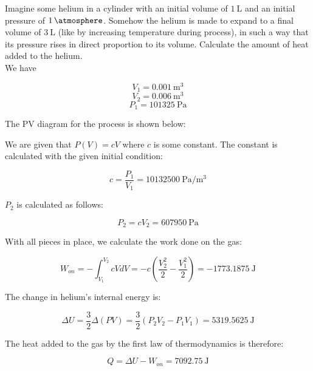 \documentclass[12pt, a4paper]{article}
\newcounter{exa}
\begin{document}
\begin{texample}
Imagine some helium in a cylinder with an initial volume of $\SI{1}{\liter}$ and an initial pressure of $\SI{1}{\atmosphere}$. Somehow the helium is made to expand to a final volume of $\SI{3}{\liter}$ (like by increasing temperature during process), in such a way that its pressure rises in direct proportion to its volume. Calculate the amount of heat added to the helium. \\

We have

\[V_1=\SI{0.001}{\cubic\meter}\]
\[V_2=\SI{0.006}{\cubic\meter}\]
\[P_1=\SI{101325}{\pascal}\]

The PV diagram for the process is shown below:

\begin{figure}[H]
\centering
{}
\end{figure}

We are given that $P(V)=cV$ where $c$ is some constant. The constant is calculated with the given initial condition:

\[c=\frac{P_1}{V_1}=\SI{10132500}{\pascal\per\cubic\meter}\]

$P_2$ is calculated as follows:

\[P_2=cV_2=\SI{607950}{\pascal}\]

With all pieces in place, we calculate the work done on the gas:

\[W_{on}=-\int_{V_1}^{V_2} cVdV=-c\left( \frac{V_2^2}{2} - \frac{V_1^2}{2} \right)=\SI{-1773.1875}{\joule}\]

The change in helium's internal energy is:

\[\Delta U=\frac{3}{2}\Delta(PV)=\frac{3}{2}(P_2V_2-P_1V_1)=\SI{5319.5625}{\joule}\]

The heat added to the gas by the first law of thermodynamics is therefore:

\[Q=\Delta U-W_{on}=\SI{7092.75}{\joule}\]

\end{texample}
\end{document}
